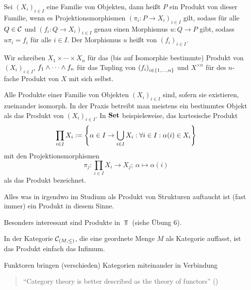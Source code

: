 \documentclass{book}
\begin{document}
\begin{definition}
    Sei ${(X_i)}_{i\in I}$ eine Familie von Objekten, dann heißt $P$ ein Produkt von dieser Familie, wenn es Projektionsmorphismen ${(\pi_i:P\to X_i)}_{i\in I}$ gilt, sodass für alle $Q\in\mathcal{C}$ und ${(f_i:Q\to X_i)}_{i\in I}$ genau einen Morphismus $u:Q\to P$ gibt, sodass $u\pi_i=f_i$ für alle $i\in I$. Der Morphismus $u$ heißt  von ${(f_i)}_{i\in I}$.
\end{definition}

\begin{remark}
    Wir schreiben $X_1\times\cdots\times X_n$ für das (bis auf Isomorphie bestimmte) Produkt von ${(X_i)}_{i\in I}$, $f_1\wedge\cdots\wedge f_n$ für das Tupling von ${(f_i)}_{i\in\left\{1,\ldots,n\right\}}$ und $X^{\times n}$ für des $n$-fache Produkt von $X$ mit sich selbst.
\end{remark}

\begin{remark}
    Alle Produkte einer Familie von Objekten ${(X_i)}_{i\in I}$ sind, sofern sie existieren, zueinander isomorph. In der Praxis betreibt man meistens ein bestimmtes Objekt als das Produkt von ${(X_i)}_{i\in I}$. In $\mathbf{Set}$ beispielsweise, das kartesische Produkt
    $$
    \prod_{i\in I}{X_i}:=\left\{\alpha\in I\rightarrow\bigcup_{i\in I}{X_i}: \forall i\in I:\alpha(i)\in X_i\right\}
    $$
    mit den Projektionsmorphismen
    $$
    \pi_j:\prod_{i\in I}{X_i}\to X_j;\ \alpha\mapsto \alpha(i)
    $$
    als das Produkt bezeichnet.
\end{remark}

\begin{example}
    Alles was in irgendwo im Studium als Produkt von Strukturen auftaucht ist (fast immer) ein Produkt in diesem Sinne.
\end{example}

\begin{example}
    Besonders interessant sind Produkte in $\Top$ (siehe Übung 6).%
\end{example}

\begin{example}
    In der Kategorie $\mathcal{C}_{(M,\leq)}$, die eine geordnete Menge $M$ als Kategorie auffasst, ist das Produkt einfach das Infimum.
\end{example}

Funktoren bringen (verschieden) Kategorien miteinander in Verbindung

\begin{quotation}
    ``Category theory is better described as the theory of functors'' ()
\end{quotation}
\end{document}
